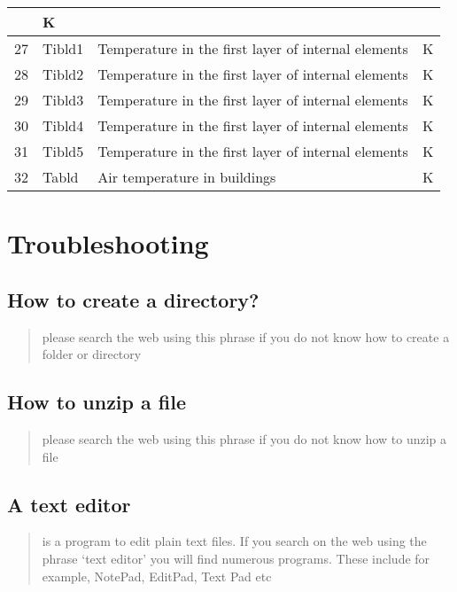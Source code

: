 \documentclass[letterpaper,10pt,english]{sphinxmanual}
\begin{document}
\begin{savenotes}
\begin{longtable}{|l|l|l|l|}
&
K
\\
\hline
27
&
Tibld1
&
Temperature in the first layer of internal elements
&
K
\\
\hline
28
&
Tibld2
&
Temperature in the first layer of internal elements
&
K
\\
\hline
29
&
Tibld3
&
Temperature in the first layer of internal elements
&
K
\\
\hline
30
&
Tibld4
&
Temperature in the first layer of internal elements
&
K
\\
\hline
31
&
Tibld5
&
Temperature in the first layer of internal elements
&
K
\\
\hline
32
&
Tabld
&
Air temperature in buildings
&
K
\\
\hline
\end{longtable}\sphinxatlongtableend\end{savenotes}


\chapter{Troubleshooting}
\label{\detokenize{troubleshooting::doc}}\label{\detokenize{troubleshooting:troubleshooting}}

\section{How to create a directory?}
\label{\detokenize{troubleshooting:how-to-create-a-directory}}\begin{quote}

please search the web using this phrase if you do not know how to
create a folder or directory
\end{quote}


\section{How to unzip a file}
\label{\detokenize{troubleshooting:how-to-unzip-a-file}}\begin{quote}

please search the web using this phrase if you do not know how to
unzip a file
\end{quote}


\section{A text editor}
\label{\detokenize{troubleshooting:a-text-editor}}\begin{quote}

is a program to edit plain text files. If you search on the web
using the phrase ‘text editor’ you will find numerous programs.
These include for example, NotePad, EditPad, Text Pad etc
\end{quote}
\end{document}
